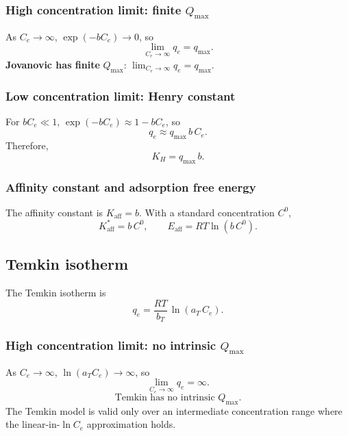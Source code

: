 \documentclass[journal=jacsat,manuscript=article]{achemso}
\begin{document}
\subsubsection{High concentration limit: finite $Q_{\max}$}

As $C_e \to \infty$, $\exp(-bC_e) \to 0$, so
\begin{equation}
	\lim_{C_e \to \infty} q_e = q_{\max}.
\end{equation}
\textbf{Jovanovic has finite }$Q_{\max}$:\quad
$\displaystyle \lim_{C_e \to \infty} q_e = q_{\max}$.

\subsubsection{Low concentration limit: Henry constant}

For $bC_e \ll 1$, $\exp(-bC_e) \approx 1 - bC_e$, so
\begin{equation}
	q_e \approx q_{\max}\, b\, C_e.
\end{equation}
Therefore,
\begin{equation}
	\boxed{K_H = q_{\max}\, b.}
\end{equation}

\subsubsection{Affinity constant and adsorption free energy}

The affinity constant is $K_{\mathrm{aff}} = b$. With a standard concentration $C^0$,
\begin{equation}
	\boxed{
		K_{\mathrm{aff}}^{\ast} = b\, C^0,
		\qquad
		E_{\mathrm{aff}} = RT\ln(b\, C^0).
	}
\end{equation}

\subsection{Temkin isotherm}
\label{sec:si_temkin}

The Temkin isotherm is
\begin{equation}
	q_e = \frac{RT}{b_T}\,\ln(a_T\, C_e).
	\label{eq:si_temkin}
\end{equation}

\subsubsection{High concentration limit: no intrinsic $Q_{\max}$}

As $C_e \to \infty$, $\ln(a_T C_e) \to \infty$, so
\begin{equation}
	\lim_{C_e \to \infty} q_e = \infty.
\end{equation}
\begin{equation}
	\boxed{\text{Temkin has no intrinsic } Q_{\max}.}
\end{equation}
The Temkin model is valid only over an intermediate concentration range where the linear-in-$\ln C_e$ approximation holds.
\end{document}
